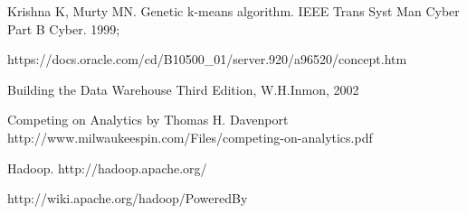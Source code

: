\documentclass[10pt,journal,compsoc]{IEEEtran}
\begin{document}
\begin{thebibliography}{1}
Krishna K, Murty MN. Genetic k-means algorithm. IEEE Trans Syst Man Cyber Part B Cyber. 1999;

https://docs.oracle.com/cd/B10500\_01/server.920/a96520/concept.htm

Building the Data Warehouse Third Edition, W.H.Inmon, 2002

Competing on Analytics by Thomas H. Davenport
http://www.milwaukeespin.com/Files/competing-on-analytics.pdf

Hadoop. http://hadoop.apache.org/

http://wiki.apache.org/hadoop/PoweredBy

\end{thebibliography}
\end{document}
